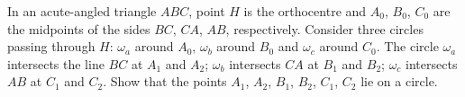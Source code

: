 In an acute-angled triangle $ABC$, point $H$ is the orthocentre and $A_0$, $B_0$, $C_0$ are the midpoints of the sides $BC$, $CA$, $AB$, respectively. Consider three circles passing through $H$: $\omega_a$ around $A_0$, $\omega_b$ around $B_0$ and $\omega_c$ around $C_0$. The circle $\omega_a$ intersects the line $BC$ at $A_1$ and $A_2$; $\omega_b$ intersects $CA$ at $B_1$ and $B_2$; $\omega_c$ intersects $AB$ at $C_1$ and $C_2$. Show that the points $A_1$, $A_2$, $B_1$, $B_2$, $C_1$, $C_2$ lie on a circle.
